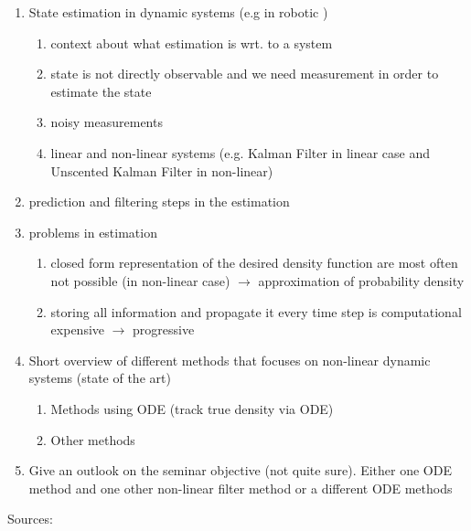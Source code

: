 \documentclass[a4paper]{IEEEtran}
\begin{document}
\begin{enumerate}
    \item State estimation in dynamic systems (e.g in robotic )
    \begin{enumerate}
        \item context about what estimation is wrt. to a system
        \item state is not directly observable and we need measurement in order to estimate the state
        \item noisy measurements
        \item linear and non-linear systems (e.g. Kalman Filter in linear case and Unscented Kalman Filter in non-linear)
    \end{enumerate}
    \item prediction and filtering steps in the estimation
    \item problems in estimation
    \begin{enumerate}
        \item closed form representation of the desired density function are most often not possible 
        (in non-linear case) $\rightarrow$ approximation of probability density
        \item storing all information and propagate it every time step is computational expensive $\rightarrow$ progressive
    \end{enumerate}
    \item Short overview of different methods that focuses on non-linear dynamic systems (state of the art)
    \begin{enumerate}
        \item Methods using ODE (track true density via ODE)
        \item Other methods
    \end{enumerate} 
    \item Give an outlook on the seminar objective (not quite sure). Either one ODE method and one other non-linear filter method
    or a different ODE methods
\end{enumerate}
Sources:
\cite{hanebeck2003}
\cite{huber2008a}
\cite{daum2005}
\cite{hagmar2011}
\end{document}
